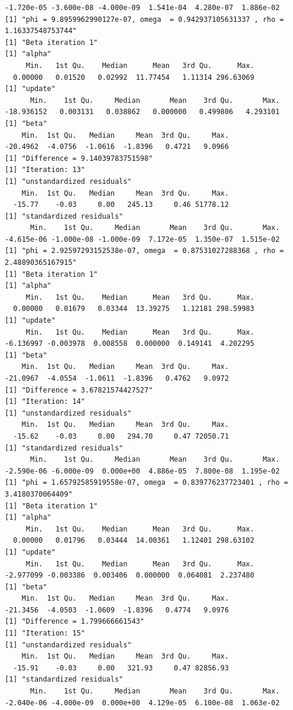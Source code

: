 \documentclass[10pt]{article}
\theoremstyle{definition}
\begin{document}
\begin{itemize}
\begin{verbatim}
-1.720e-05 -3.600e-08 -4.000e-09  1.541e-04  4.280e-07  1.886e-02
[1] "phi = 9.8959962990127e-07, omega  = 0.942937105631337 , rho = 1.16337548753744"
[1] "Beta iteration 1"
[1] "alpha"
     Min.   1st Qu.    Median      Mean   3rd Qu.      Max.
  0.00000   0.01520   0.02992  11.77454   1.11314 296.63069
[1] "update"
      Min.    1st Qu.     Median       Mean    3rd Qu.       Max.
-18.936152   0.003131   0.038862   0.000000   0.499806   4.293101
[1] "beta"
    Min.  1st Qu.   Median     Mean  3rd Qu.     Max.
-20.4962  -4.0756  -1.0616  -1.8396   0.4721   9.0966
[1] "Difference = 9.14039783751598"
[1] "Iteration: 13"
[1] "unstandardized residuals"
    Min.  1st Qu.   Median     Mean  3rd Qu.     Max.
  -15.77    -0.03     0.00   245.13     0.46 51778.12
[1] "standardized residuals"
      Min.    1st Qu.     Median       Mean    3rd Qu.       Max.
-4.615e-06 -1.000e-08 -1.000e-09  7.172e-05  1.350e-07  1.515e-02
[1] "phi = 2.92597293152538e-07, omega  = 0.87531027288368 , rho = 2.48890365167915"
[1] "Beta iteration 1"
[1] "alpha"
     Min.   1st Qu.    Median      Mean   3rd Qu.      Max.
  0.00000   0.01679   0.03344  13.39275   1.12181 298.59983
[1] "update"
     Min.   1st Qu.    Median      Mean   3rd Qu.      Max.
-6.136997 -0.003978  0.008558  0.000000  0.149141  4.202295
[1] "beta"
    Min.  1st Qu.   Median     Mean  3rd Qu.     Max.
-21.0967  -4.0554  -1.0611  -1.8396   0.4762   9.0972
[1] "Difference = 3.67821574427527"
[1] "Iteration: 14"
[1] "unstandardized residuals"
    Min.  1st Qu.   Median     Mean  3rd Qu.     Max.
  -15.62    -0.03     0.00   294.70     0.47 72050.71
[1] "standardized residuals"
      Min.    1st Qu.     Median       Mean    3rd Qu.       Max.
-2.590e-06 -6.000e-09  0.000e+00  4.886e-05  7.800e-08  1.195e-02
[1] "phi = 1.65792585919558e-07, omega  = 0.839776237723401 , rho = 3.4180370064409"
[1] "Beta iteration 1"
[1] "alpha"
     Min.   1st Qu.    Median      Mean   3rd Qu.      Max.
  0.00000   0.01796   0.03444  14.00361   1.12401 298.63102
[1] "update"
     Min.   1st Qu.    Median      Mean   3rd Qu.      Max.
-2.977099 -0.003386  0.003406  0.000000  0.064081  2.237480
[1] "beta"
    Min.  1st Qu.   Median     Mean  3rd Qu.     Max.
-21.3456  -4.0503  -1.0609  -1.8396   0.4774   9.0976
[1] "Difference = 1.799666661543"
[1] "Iteration: 15"
[1] "unstandardized residuals"
    Min.  1st Qu.   Median     Mean  3rd Qu.     Max.
  -15.91    -0.03     0.00   321.93     0.47 82856.93
[1] "standardized residuals"
      Min.    1st Qu.     Median       Mean    3rd Qu.       Max.
-2.040e-06 -4.000e-09  0.000e+00  4.129e-05  6.100e-08  1.063e-02

\end{verbatim}
\end{itemize}
\end{document}
